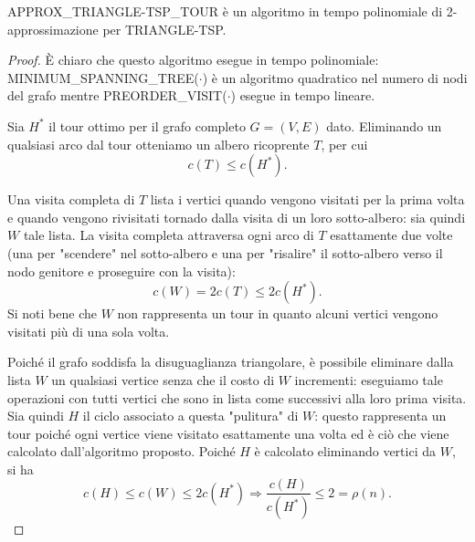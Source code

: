 \begin{teorema}
APPROX\_TRIANGLE-TSP\_TOUR è un algoritmo in tempo polinomiale di 2-approssimazione per TRIANGLE-TSP.
\end{teorema}
\begin{proof}
È chiaro che questo algoritmo esegue in tempo polinomiale: MINIMUM\_SPANNING\_TREE($\cdot$) è un algoritmo quadratico nel numero di nodi del grafo mentre PREORDER\_VISIT($\cdot$) esegue in tempo lineare.

Sia $H^*$ il tour ottimo per il grafo completo $G=(V,E)$ dato. Eliminando un qualsiasi arco dal tour otteniamo un albero ricoprente $T$, per cui
\[
c(T) \leq c(H^*) \mbox{.}
\]

Una visita completa di $T$ lista i vertici quando vengono visitati per la prima volta e quando vengono rivisitati tornado dalla visita di un loro sotto-albero: sia quindi $W$ tale lista. La visita completa attraversa ogni arco di $T$ esattamente due volte (una per "scendere" nel sotto-albero e una per "risalire" il sotto-albero verso il nodo genitore e proseguire con la visita):
\[
c(W) = 2c(T) \leq 2c(H^*) \mbox{.}
\]
Si noti bene che $W$ non rappresenta un tour in quanto alcuni vertici vengono visitati più di una sola volta.

Poiché il grafo soddisfa la disuguaglianza triangolare, è possibile eliminare dalla lista $W$ un qualsiasi vertice senza che il costo di $W$ incrementi: eseguiamo tale operazioni con tutti vertici che sono in lista come successivi alla loro prima visita. Sia quindi $H$ il ciclo associato a questa "pulitura" di $W$: questo rappresenta un tour poiché ogni vertice viene visitato esattamente una volta ed è ciò che viene calcolato dall'algoritmo proposto. Poiché $H$ è calcolato eliminando vertici da $W$, si ha
\[
c(H) \leq c(W) \leq 2c(H^*) \Rightarrow \frac{c(H)}{c(H^*)} \leq 2 = \rho(n) \mbox{.}
\]
\end{proof}

